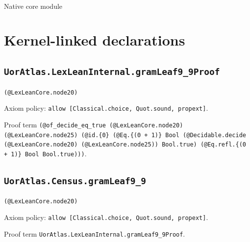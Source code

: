 \documentclass[11pt]{article}
\begin{document}
\begin{center}{\LARGE Native core module}\end{center}
\section*{Kernel-linked declarations}
\subsection*{\texttt{UorAtlas.LexLeanInternal.gramLeaf9\_9Proof}}
\noindent\texttt{(@LexLeanCore.node20)}\par
\noindent Axiom policy: \texttt{allow [Classical.choice, Quot.sound, propext]}.\par
\noindent Proof term \texttt{(@of\_decide\_eq\_true (@LexLeanCore.node20) (@LexLeanCore.node25) (@id.\{0\} (@Eq.\{(0 + 1)\} Bool (@Decidable.decide (@LexLeanCore.node20) (@LexLeanCore.node25)) Bool.true) (@Eq.refl.\{(0 + 1)\} Bool Bool.true)))}.\par
\subsection*{\texttt{UorAtlas.Census.gramLeaf9\_9}}
\noindent\texttt{(@LexLeanCore.node20)}\par
\noindent Axiom policy: \texttt{allow [Classical.choice, Quot.sound, propext]}.\par
\noindent Proof term \texttt{UorAtlas.LexLeanInternal.gramLeaf9\_9Proof}.\par
\end{document}
